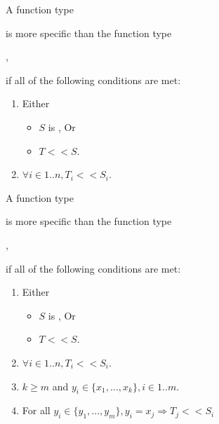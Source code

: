 \documentclass{article}
\begin{document}

\LMHash{}
A function type



\noindent
is more specific than the function type


,

\noindent
if all of the following conditions are met:
\begin{enumerate}
\item Either
\begin{itemize}
\item $S$ is \VOID{}, Or
\item $T << S$.
\end{itemize}
\item $\forall i \in 1 .. n, T_i << S_i$.
\end{enumerate}

\LMHash{}
A function type



\noindent
is more specific than the function type


,

\noindent
if all of the following conditions are met:
\begin{enumerate}
\item Either
\begin{itemize}
\item $S$ is \VOID{}, Or
\item $T << S$.
\end{itemize}
\item $\forall i \in 1 .. n, T_i << S_i$.
\item $k \ge m$ and $y_i \in \{x_1, \ldots, x_k\}, i \in 1 .. m$.
\item For all $y_i \in \{y_1, \ldots, y_m\}, y_i = x_j \Rightarrow T_j << S_i$
\end{enumerate}
\end{document}
